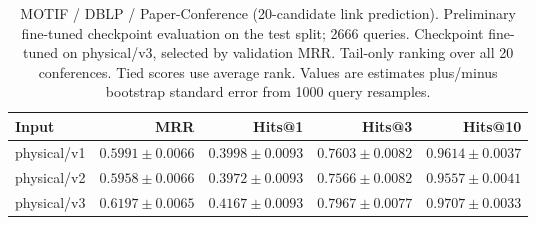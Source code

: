 \begin{table}[t]
\centering
\small
\begin{tabular}{lrrrr}
\toprule
Input & MRR & Hits@1 & Hits@3 & Hits@10 \\
\midrule
physical/v1 & $0.5991 \pm 0.0066$ & $0.3998 \pm 0.0093$ & $0.7603 \pm 0.0082$ & $0.9614 \pm 0.0037$ \\
physical/v2 & $0.5958 \pm 0.0066$ & $0.3972 \pm 0.0093$ & $0.7566 \pm 0.0082$ & $0.9557 \pm 0.0041$ \\
physical/v3 & $0.6197 \pm 0.0065$ & $0.4167 \pm 0.0093$ & $0.7967 \pm 0.0077$ & $0.9707 \pm 0.0033$ \\
\bottomrule
\end{tabular}
\caption{MOTIF / DBLP / Paper-Conference (20-candidate link prediction). Preliminary fine-tuned checkpoint evaluation on the test split; 2666 queries. Checkpoint fine-tuned on physical/v3, selected by validation MRR. Tail-only ranking over all 20 conferences. Tied scores use average rank. Values are estimates plus/minus bootstrap standard error from 1000 query resamples.}
\label{tab:motif-paper_conference-link_prediction}
\end{table}

